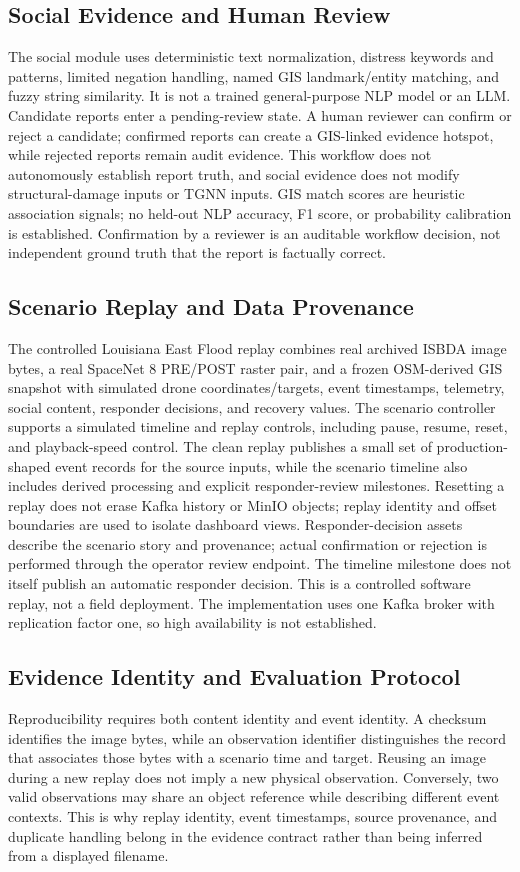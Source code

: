 \documentclass[conference]{IEEEtran}
\newcommand{\changed}[1]{{\color{blue}#1}}
\newcommand{\changed}[1]{#1}
\begin{document}
\subsection{Social Evidence and Human Review}
The social module uses deterministic text normalization, distress keywords and patterns, limited negation handling, named GIS landmark/entity matching, and fuzzy string similarity. It is not a trained general-purpose NLP model or an LLM. Candidate reports enter a pending-review state. A human reviewer can confirm or reject a candidate; confirmed reports can create a GIS-linked evidence hotspot, while rejected reports remain audit evidence. This workflow does not autonomously establish report truth, and social evidence does not modify structural-damage inputs or TGNN inputs. \changed{GIS match scores are heuristic association signals; no held-out NLP accuracy, F1 score, or probability calibration is established.} Confirmation by a reviewer is an auditable workflow decision, not independent ground truth that the report is factually correct.

\subsection{Scenario Replay and Data Provenance}
The controlled Louisiana East Flood replay combines real archived ISBDA image bytes, a real SpaceNet 8 PRE/POST raster pair, and a frozen OSM-derived GIS snapshot with simulated drone coordinates/targets, event timestamps, telemetry, social content, responder decisions, and recovery values. The scenario controller supports a simulated timeline and replay controls, including pause, resume, reset, and playback-speed control. The clean replay publishes a small set of production-shaped event records for the source inputs, while the scenario timeline also includes derived processing and explicit responder-review milestones. Resetting a replay does not erase Kafka history or MinIO objects; replay identity and offset boundaries are used to isolate dashboard views. \changed{Responder-decision assets describe the scenario story and provenance; actual confirmation or rejection is performed through the operator review endpoint. The timeline milestone does not itself publish an automatic responder decision.} This is a controlled software replay, not a field deployment. The implementation uses one Kafka broker with replication factor one, so high availability is not established.


\subsection{Evidence Identity and Evaluation Protocol}
\changed{Reproducibility requires both content identity and event identity. A checksum identifies the image bytes, while an observation identifier distinguishes the record that associates those bytes with a scenario time and target. Reusing an image during a new replay does not imply a new physical observation. Conversely, two valid observations may share an object reference while describing different event contexts. This is why replay identity, event timestamps, source provenance, and duplicate handling belong in the evidence contract rather than being inferred from a displayed filename.}
\end{document}
